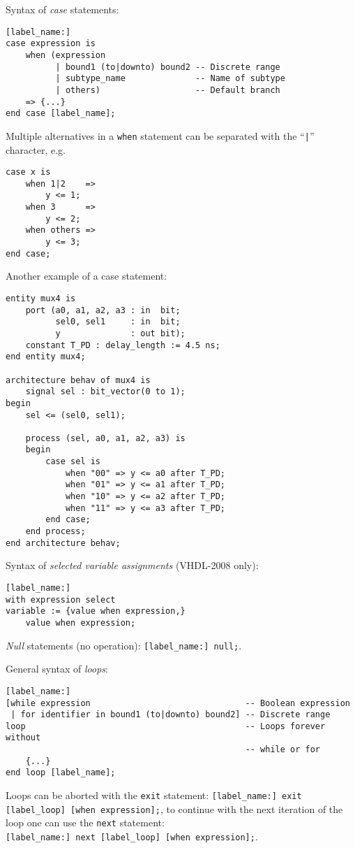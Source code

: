 \documentclass[fontsize=11pt,a4paper]{scrartcl}
\begin{document}
Syntax of \emph{case} statements:
\begin{lstlisting}
[label_name:]
case expression is
	when (expression
	      | bound1 (to|downto) bound2 -- Discrete range
	      | subtype_name              -- Name of subtype
	      | others)                   -- Default branch
	=> {...}
end case [label_name];
\end{lstlisting}
Multiple alternatives in a \lstinline!when! statement can be separated with the ``\lstinline!|!'' character, e.g.
\begin{lstlisting}
case x is
	when 1|2    =>
		y <= 1;
	when 3      =>
		y <= 2;
	when others =>
		y <= 3;
end case;
\end{lstlisting}

Another example of a case statement:
\begin{lstlisting}
entity mux4 is
	port (a0, a1, a2, a3 : in  bit;
	      sel0, sel1     : in  bit;
	      y              : out bit);
	constant T_PD : delay_length := 4.5 ns;
end entity mux4;

architecture behav of mux4 is
	signal sel : bit_vector(0 to 1);
begin
	sel <= (sel0, sel1);

	process (sel, a0, a1, a2, a3) is
	begin
		case sel is
			when "00" => y <= a0 after T_PD;
			when "01" => y <= a1 after T_PD;
			when "10" => y <= a2 after T_PD;
			when "11" => y <= a3 after T_PD;
		end case;
	end process;
end architecture behav;
\end{lstlisting}

Syntax of \emph{selected variable assignments} (VHDL-2008 only):
\begin{lstlisting}
[label_name:]
with expression select
variable := {value when expression,}
	value when expression;
\end{lstlisting}

\emph{Null} statements (no operation): \lstinline![label_name:] null;!.

General syntax of \emph{loops}:
\begin{lstlisting}
[label_name:]
[while expression                               -- Boolean expression
 | for identifier in bound1 (to|downto) bound2] -- Discrete range
loop                                            -- Loops forever without
                                                -- while or for
	{...}
end loop [label_name];
\end{lstlisting}

Loops can be aborted with the \lstinline!exit! statement: \lstinline![label_name:] exit [label_loop] [when expression];!, to continue with the next iteration of the loop one can use the \lstinline!next! statement:\\ \lstinline![label_name:] next [label_loop] [when expression];!.
\end{document}
